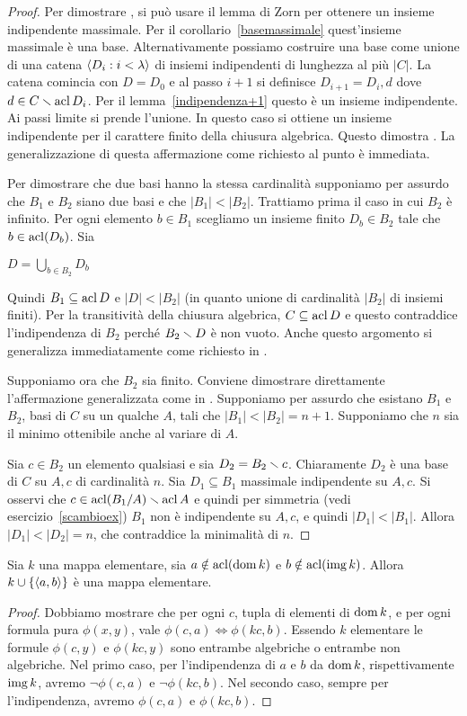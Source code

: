 \begin{proof}
Per dimostrare , si pu\`o usare il lemma di Zorn per ottenere un insieme indipendente massimale. Per il corollario~\ref{basemassimale} quest'insieme massimale \`e una base. Alternativamente possiamo costruire una base come unione di una catena $\langle D_i:i<\lambda\rangle$ di insiemi indipendenti di lunghezza al pi\`u $|C|$. La catena comincia con $D=D_0$ e al passo $i+1$ si definisce $D_{i+1}=D_i,d$ dove $d\in C\smallsetminus\mathop{\rm acl} D_i$. Per il lemma~\ref{indipendenza+1} questo \`e un insieme indipendente. Ai passi limite si prende l'unione. In questo caso si ottiene un insieme indipendente per il carattere finito della chiusura algebrica. Questo dimostra . La generalizzazione di questa affermazione come richiesto al punto  \`e immediata.

Per dimostrare che due basi hanno la stessa cardinalit\`a supponiamo per assurdo che $B_1$ e $B_2$ siano due basi e che $|B_1|<|B_2|$. Trattiamo prima il caso in cui $B_2$  \`e infinito. Per ogni elemento $b\in B_1$ scegliamo un insieme finito $D_b\in B_2$ tale che $b\in\mathop{\rm acl}(D_b)$. Sia

\hfil$\displaystyle D=\bigcup_{b\in B_2}D_b$

Quindi $B_1\subseteq\mathop{\rm acl} D$ e $|D|<|B_2|$ (in quanto unione di cardinalit\`a $|B_2|$ di insiemi finiti). Per la transitivit\`a della chiusura algebrica, $C\subseteq\mathop{\rm acl} D$ e questo contraddice l'indipendenza di $B_2$ perch\'e $B_2\smallsetminus D$ \`e non vuoto. Anche questo argomento si generalizza immediatamente come richiesto in . 

Supponiamo ora che $B_2$ sia finito. Conviene dimostrare direttamente l'affermazione generalizzata come in . Supponiamo per assurdo che esistano $B_1$ e $B_2$, basi di $C$ su un qualche $A$, tali che $|B_1|<|B_2|=n+1$. Supponiamo che $n$ sia il minimo ottenibile anche al variare di $A$. 

Sia $c\in B_2$ un elemento qualsiasi e sia $D_2=B_2\smallsetminus c$. Chiaramente $D_2$ \`e una base di $C$ su $A, c$ di cardinalit\`a $n$. Sia $D_1\subseteq B_1$ massimale indipendente su $A,c$. Si osservi che $c\in\mathop{\rm acl}(B_1/A)\smallsetminus\mathop{\rm acl} A$ e quindi per simmetria (vedi esercizio~\ref{scambioex}) $B_1$ non \`e indipendente su $A,c$, e quindi $|D_1|<|B_1|$. Allora $|D_1|<|D_2|=n$, che contraddice  la minimalit\`a di $n$.
\end{proof}

\begin{theorem}\label{mappetraindipendenti} 
Sia $k$ una mappa elementare, sia $a\notin\mathop{\rm acl}(\mathop{\rm dom} k)$ e $b\notin\mathop{\rm acl}(\mathop{\rm img} k)$. Allora $k\cup\{\langle a,b\rangle\}$ \`e una mappa elementare.
\end{theorem}
\begin{proof}
Dobbiamo mostrare che per ogni $c$, tupla di elementi di $\mathop{\rm dom} k$, e per ogni formula pura $\phi(x,y)$, vale $\phi(c,a)\iff\phi(kc,b)$. Essendo $k$ elementare le formule $\phi(c,y)$ e  $\phi(kc,y)$ sono entrambe algebriche o entrambe non algebriche. Nel primo caso, per l'indipendenza di $a$ e $b$ da $\mathop{\rm dom} k$, rispettivamente $\mathop{\rm img} k$, avremo  $\neg\phi(c,a)$ e $\neg\phi(kc,b)$. Nel secondo caso, sempre per l'indipendenza, avremo $\phi(c,a)$ e $\phi(kc,b)$.
\end{proof}


